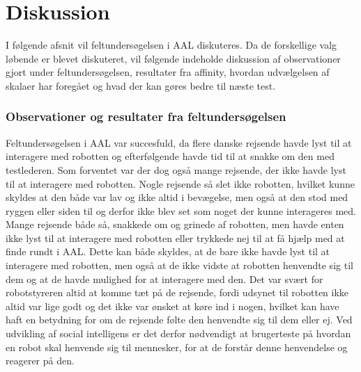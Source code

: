\chapter{Diskussion}
\label{ParametreDiskussion}
%
I følgende afsnit vil feltundersøgelsen i AAL diskuteres. Da de forskellige valg løbende er blevet diskuteret, vil følgende indeholde diskussion af observationer gjort under feltundersøgelsen, resultater fra affinity, hvordan udvælgelsen af skalaer har foregået og hvad der kan gøres bedre til næste test.
%
\subsection{Observationer og resultater fra feltundersøgelsen}
\label{DiskussionerObservationer}
%
Feltundersøgelsen i AAL var succesfuld, da flere danske rejsende havde lyst til at interagere med robotten og efterfølgende havde tid til at snakke om den med testlederen. Som forventet var der dog også mange rejsende, der ikke havde lyst til at interagere med robotten. Nogle rejsende så slet ikke robotten, hvilket kunne skyldes at den både var lav og ikke altid i bevægelse, men også at den stod med ryggen eller siden til og derfor ikke blev set som noget der kunne interageres med. Mange rejsende både så, snakkede om og grinede af robotten, men havde enten ikke lyst til at interagere med robotten eller trykkede nej til at få hjælp med at finde rundt i AAL. Dette kan både skyldes, at de bare ikke havde lyst til at interagere med robotten, men også at de ikke vidste at robotten henvendte sig til dem og at de havde mulighed for at interagere med den. Det var svært for robotstyreren altid at komme tæt på de rejsende, fordi udsynet til robotten ikke altid var lige godt og det ikke var ønsket at køre ind i nogen, hvilket kan have haft en betydning for om de rejsende følte den henvendte sig til dem eller ej. Ved udvikling af social intelligens er det derfor nødvendigt at brugerteste på hvordan en robot skal henvende sig til mennesker, for at de forstår denne henvendelse og reagerer på den.

